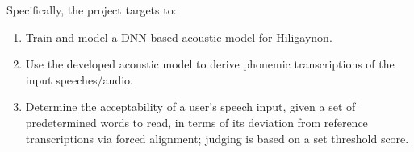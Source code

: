 \begin{comment}
How to formulate your research objectives:
1. Identify what research steps do you need to perform to achieve your general objective.
2. Identify the questions that must be answered for you to achieve your general objective.
    Thereafter, convert these questions into action statements

Example #1:

Research Question:
  What are the general features of a web-based learning environment?

Specific Objective:
   To review existing web-based learning environment that teaches language learning for children


Example #2:

Research Question:
   How will you represent commonsense knowledge for use by computer systems?

Specific Objective:
   To identify knowledge representation approaches used by existing story generation systems

Example #3:
Research Question:
   What types of storytelling knowledge are needed to generate stories?

Specific Objective:
    To identify the different types of storytelling knowledge used in generating stories

Example #4:
Research Question:
    What machine learning approaches will you utilize?

Specific Objective:
    To determine existing machine learning algorithms [that can be used in training the computer system to detect cyberbullying cases] 

Example #5: Research Question:
    How will your research output be evaluated?

Specific Objective:
    To define evaluation metrics for validating the accuracy of the translation

\end{comment}

%
%
Specifically, the project targets to:
\begin{enumerate}
   \item Train and model a DNN-based acoustic model for Hiligaynon.
   \item Use the developed acoustic model to derive phonemic transcriptions of the input speeches/audio.
   \item Determine the acceptability of a user's speech input, given a set of predetermined words to read, in terms of its deviation from reference transcriptions via forced alignment; judging is based on a set threshold score.
\end{enumerate}


